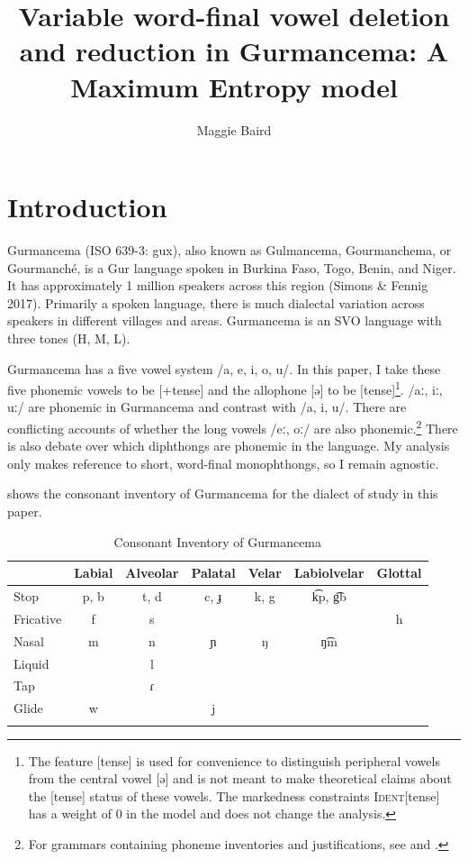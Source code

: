 \documentclass[output=paper,newtxmath,modfonts,nonflat,draftmode]{langsci/langscibook}
\title{Variable word-final vowel deletion and reduction in Gurmancema: A Maximum Entropy model}
\author{Maggie Baird\affiliation{Dartmouth College}}
\begin{document}
 

\maketitle
\section{Introduction}\label{sec:baird:1}
Gurmancema (ISO 639-3: gux), also known as Gulmancema, Gourmanchema, or Gourmanché, is a Gur language spoken in Burkina Faso, Togo, Benin, and Niger. It has approximately 1 million speakers across this region \cite{ethnologue} (Simons \& Fennig 2017). Primarily a spoken language, there is much dialectal variation across speakers in different villages and areas. Gurmancema is an SVO language with three tones (H, M, L). 

Gurmancema has a five vowel system /a, e, i, o, u/. In this paper, I take these five phonemic vowels to be [+tense] and the allophone [ə] to be [\textminus tense]\footnote{The feature [tense] is used for convenience to distinguish peripheral vowels from the central vowel [ə] and is not meant to make theoretical claims about the [tense] status of these vowels. The markedness constraints \textsc{Ident}[tense] has a weight of 0 in the model and does not change the analysis.}.  /aː, iː, uː/ are phonemic in Gurmancema and contrast with /a, i, u/. There are conflicting accounts of whether the long vowels /eː, oː/ are also phonemic.\footnote{For grammars containing phoneme inventories and justifications, see \citet{Chantoux1968} and \citet{Naba1994}.} There is also debate over which diphthongs are phonemic in the language. My analysis only makes reference to short, word-final monophthongs, so I remain agnostic.

 shows the consonant inventory of Gurmancema for the dialect of study in this paper. 

\begin{table}
\caption{Consonant Inventory of Gurmancema}
\label{tab:baird:1}
\begin{tabularx}{\textwidth}{Xcccccc}
\lsptoprule
  & Labial & Alveolar & Palatal & Velar & Labiolvelar & Glottal\\ 
 \midrule
 Stop & p, b & t, d & c, ɟ & k, g & k͡p, g͡b & \\
 Fricative & f & s &  &  &  & h\\
 Nasal & m & n & ɲ & ŋ & ŋ͡m & \\
 Liquid &  & l &  &  & & \\
 Tap &  & ɾ  &  &  &  & \\
 Glide & w & & j & &  & \\
 \lspbottomrule
 \end{tabularx}
\end{table}
\end{document}
